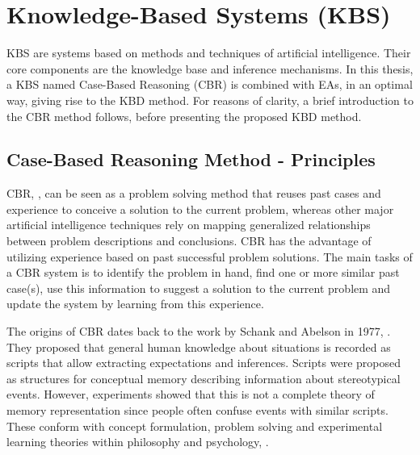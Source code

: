 
\section{Knowledge-Based Systems (KBS)}  
KBS \cite{Akerkar:2009:KS:1795845}  are systems based on methods and techniques of artificial intelligence. Their core components are the knowledge base and inference mechanisms. In this thesis, a KBS named Case-Based Reasoning (CBR) \cite{kolodner_1991} is combined with EAs, in an optimal way, giving rise to the KBD method. For reasons of clarity, a brief introduction to the CBR method follows, before presenting the proposed KBD method.  

\subsection{Case-Based Reasoning Method - Principles}
CBR, \cite{kolodner_1991,kolodner_1993,slade_1991,riesbeck_1989}, can be seen as a problem solving method that reuses past cases and experience to conceive a solution to the current problem, 
whereas other major artificial intelligence techniques rely on mapping generalized 
relationships between problem descriptions and conclusions. CBR has the advantage 
of utilizing  experience based on past successful problem solutions. 
The main tasks of a CBR system is to identify the problem in hand, find one or 
more similar past case(s), use this information to suggest a solution to the current 
problem and update the system by learning from this experience.      

\label{History} The origins of CBR dates back to the work by
Schank and Abelson in 1977, \cite{Schank_Abelson_1977}. They proposed that general 
human knowledge about situations is recorded as scripts that allow extracting 
 expectations and inferences. Scripts were proposed as structures for conceptual 
memory describing information about stereotypical events. However, experiments 
showed that this is not a complete theory of memory representation since people 
often confuse events with similar scripts. These conform with 
concept formulation, problem solving and experimental learning theories within 
philosophy and psychology, \cite{tulving_1977,smith_1978}. 

